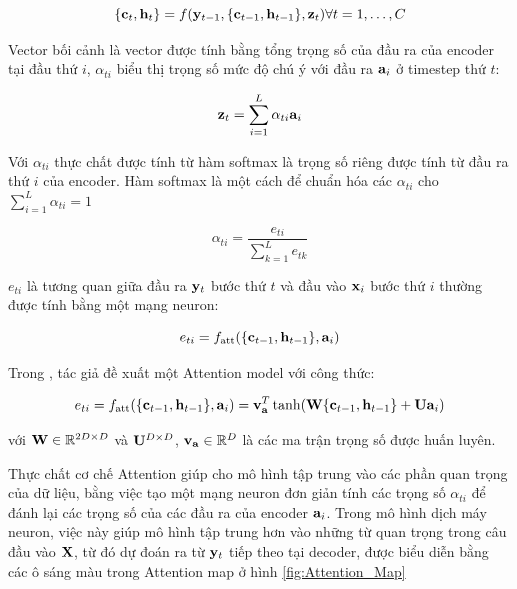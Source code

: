 \documentclass[14pt, a4paper]{article}
\numberwithin{equation}{section}
\numberwithin{algorithm}{section}
\numberwithin{figure}{section}
\numberwithin{dl}{section}
\numberwithin{md}{section}
\numberwithin{bd}{section}
\numberwithin{dn}{section}
\numberwithin{hq}{section}
\begin{document}
    \begin{equation}
        \lbrace \bold{c}_t, \bold{h}_t \rbrace = f(\bold{y}_{t-1}, \lbrace \bold{c}_{t-1}, \bold{h}_{t-1} \rbrace, \bold{z}_t) \forall t=1,\dots,C
    \end{equation}

    Vector bối cảnh là vector được tính bằng tổng trọng số của đầu ra của encoder tại đầu thứ $i$, $\alpha_{ti}$ biểu thị trọng số mức độ chú ý với đầu ra $\bold{a}_i$ ở timestep thứ $t$:

    \begin{equation}
        \bold{z}_t = \sum_{i=1}^{L}\alpha_{ti}\bold{a}_i
    \end{equation}

    Với $\alpha_{ti}$ thực chất được tính từ hàm softmax là trọng số riêng được tính từ đầu ra thứ $i$ của encoder. Hàm softmax là một cách để chuẩn hóa các $\alpha_{ti}$ cho $\sum_{i=1}^{L}\alpha_{ti}=1$

    \begin{equation}
        \alpha_{ti} = \dfrac{e_{ti}}{\sum_{k=1}^{L} e_{tk}}
    \end{equation}

    $e_{ti}$ là tương quan giữa đầu ra $\bold{y}_t$ bước thứ $t$ và đầu vào $\bold{x}_i$ bước thứ $i$ thường được tính bằng một mạng neuron:

    \begin{equation}
        e_{ti} = f_{\text{att}}(\lbrace \bold{c}_{t-1}, \bold{h}_{t-1} \rbrace, \bold{a}_i)
    \end{equation}

    Trong \cite{bahdanau2014neural}, tác giả đề xuất một Attention model với công thức:

    \begin{equation}
        e_{ti} = f_{\text{att}}(\lbrace \bold{c}_{t-1}, \bold{h}_{t-1} \rbrace, \bold{a}_i) = \bold{v}_{\bold{a}}^T \tanh (\bold{W} \lbrace \bold{c}_{t-1}, \bold{h}_{t-1} \rbrace + \bold{U}\bold{a}_i)
    \end{equation}

    với $\bold{W} \in \mathbb{R}^{2D \times D}$ và $\bold{U}^{D \times D}$, $\bold{v}_{\bold{a}} \in \mathbb{R}^{D}$ là các ma trận trọng số được huấn luyên.

    Thực chất cơ chế Attention giúp cho mô hình tập trung vào các phần quan trọng của dữ liệu, bằng việc tạo một mạng neuron đơn giản tính các trọng số $\alpha_{ti}$ để đánh lại các trọng số của các đầu ra của encoder $\bold{a}_i$.
    Trong mô hình dịch máy neuron, việc này giúp mô hình tập trung hơn vào những từ quan trọng trong câu đầu vào $\bold{X}$, từ đó dự đoán ra từ $\bold{y}_t$ tiếp theo tại decoder, được biểu diễn bằng các ô sáng màu trong Attention map ở hình \ref{fig:Attention_Map}
\end{document}
